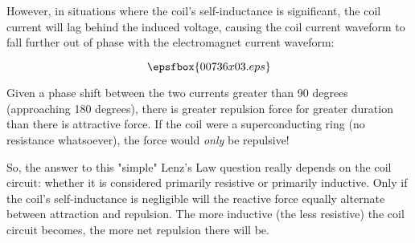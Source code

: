 \vskip 10pt

However, in situations where the coil's self-inductance is significant, the coil current will lag behind the induced voltage, causing the coil current waveform to fall further out of phase with the electromagnet current waveform:

$$\epsfbox{00736x03.eps}$$

Given a phase shift between the two currents greater than 90 degrees (approaching 180 degrees), there is greater repulsion force for greater duration than there is attractive force.  If the coil were a superconducting ring (no resistance whatsoever), the force would {\it only} be repulsive!

So, the answer to this "simple" Lenz's Law question really depends on the coil circuit: whether it is considered primarily resistive or primarily inductive.  Only if the coil's self-inductance is negligible will the reactive force equally alternate between attraction and repulsion.  The more inductive (the less resistive) the coil circuit becomes, the more net repulsion there will be.




